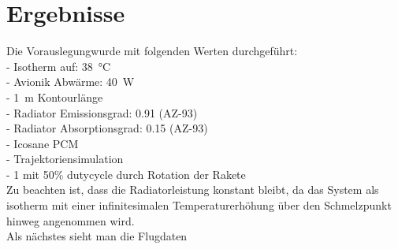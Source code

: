 \chapter{Ergebnisse}\label{chap:Ergebnisse}
Die Vorauslegungwurde mit folgenden Werten durchgeführt:\\
- Isotherm auf: \SI{38}{\celsius}\\
- Avionik Abwärme: \SI{40}{W}\\
- \SI{1}{m} Kontourlänge\\
- Radiator Emissionsgrad: \SI{0,91}{} (AZ-93)\\
- Radiator Absorptionsgrad: \SI{0,15}{} (AZ-93)\\
- Icosane PCM\\
- Trajektoriensimulation\\
- \SI{1}{} mit 50\% dutycycle durch Rotation der Rakete\\
Zu beachten ist, dass die Radiatorleistung konstant bleibt, da das System als isotherm mit einer
infinitesimalen Temperaturerhöhung über den Schmelzpunkt hinweg angenommen wird.\\
Als nächstes sieht man die Flugdaten

